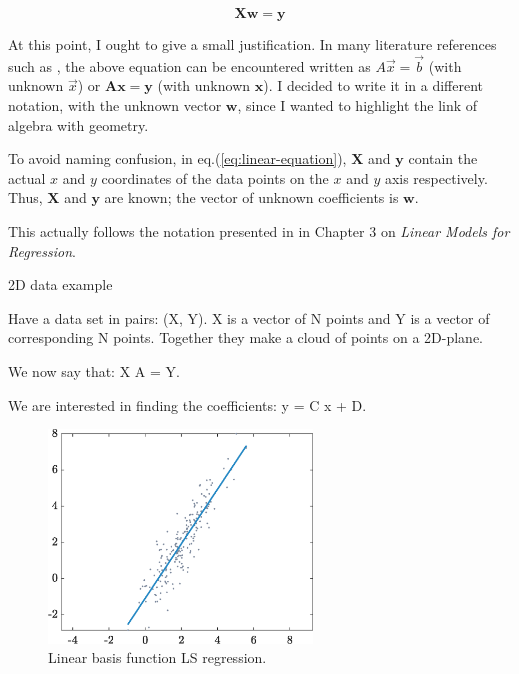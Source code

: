 \documentclass[10pt,twocolumn]{article}
\begin{document}
\begin{equation} \label{eq:linear-equation}
\bm{X} \bm{w} = \bm{y}
\end{equation}

At this point, I ought to give a small justification. In many literature references such as \cite{Strang}, the above equation can be encountered written as $A \vec{x} = \vec{b}$ (with unknown $\vec{x}$) or $\bm{A} \bm{x} = \bm{y}$ (with unknown $\bm{x}$). I decided to write it in a different notation, with the unknown vector $\bm{w}$, since I wanted to highlight the link of algebra with geometry.

To avoid naming confusion, in eq.(\ref{eq:linear-equation}), $\bm{X}$ and $\bm{y}$ contain the actual $x$ and $y$ coordinates of the data points on the $x$ and $y$ axis respectively. Thus, $\bm{X}$ and $\bm{y}$ are known; the vector of unknown coefficients is $\bm{w}$.

This actually follows the notation presented in \cite{Bishop} in Chapter 3 on \textit{Linear Models for Regression}.

2D data example

Have a data set in pairs: (X, Y). X is a vector of N points and Y is a vector of corresponding N points. Together they make a cloud of points on a 2D-plane.

We now say that: X A = Y.

We are interested in finding the coefficients: y = C x + D.












\begin{figure}[H]
\centering\includegraphics[width=7cm]{LS-linear-basis-functions.eps}
\caption{Linear basis function LS regression.}
\label{fig:LS-linear-basis}
\end{figure}
\end{document}
